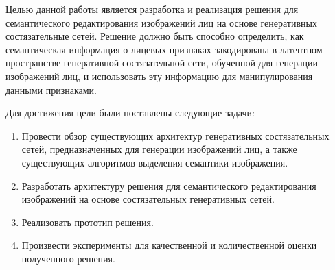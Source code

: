 Целью данной работы является разработка и реализация решения для семантического редактирования изображений лиц на основе генеративных состязательные сетей. 
Решение должно быть способно определить, как семантическая информация о лицевых признаках закодирована в латентном пространстве генеративной состязательной сети, обученной для генерации изображений лиц, и использовать эту информацию для манипулирования данными признаками.

Для достижения цели были поставлены следующие задачи:

\begin{enumerate}
\item Провести обзор существующих архитектур генеративных состязательных сетей, предназначенных для генерации изображений лиц, а также существующих алгоритмов выделения семантики изображения.
\item Разработать архитектуру решения для семантического редактирования изображений  на основе состязательных генеративных сетей.
\item Реализовать прототип решения.
\item Произвести эксперименты для качественной и количественной оценки полученного решения.
\end{enumerate}
